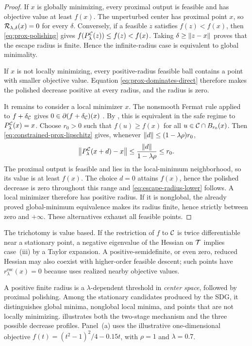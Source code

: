 \begin{proof}
  If \(x\) is globally minimizing, every proximal output is feasible and has
  objective value at least \(f(x)\).  The unperturbed center has proximal
  point \(x\), so \(\mathcal{R}_{\lambda,\delta}(x)=0\) for every \(\delta\).
  Conversely, if a feasible \(z\) satisfies \(f(z)<f(x)\), then
  \cref{eq:prox-polishing} gives
  \(f(P_\lambda^{\mathcal{C}}(z))\le f(z)<f(x)\).  Taking
  \(\delta\ge\left\lVert z-x\right\rVert\) proves that the escape radius is finite.  Hence the
  infinite-radius case is equivalent to global minimality.

  If \(x\) is not locally minimizing, every positive-radius feasible ball
  contains a point with smaller objective value.  Equation
  \eqref{eq:prox-dominates-direct} therefore makes the polished decrease
  positive at every radius, and the radius is zero.

  It remains to consider a local minimizer \(x\).  The nonsmooth Fermat rule
  applied to \(f+\delta_{\mathcal{C}}\) gives
  \(0\in\partial(f+\delta_{\mathcal{C}})(x)\)
  \cite[Theorem~10.1]{RockafellarWets1998}.  By
  , this is equivalent in the safe regime to
  \(P_\lambda^{\mathcal{C}}(x)=x\).  Choose \(r_0>0\) such that
  \(f(u)\ge f(x)\) for all \(u\in\mathcal{C}\cap B_{r_0}(x)\).  Then
  \cref{eq:constrained-prox-lipschitz} gives, whenever
  \(\left\lVert d\right\rVert\le(1-\lambda\rho)r_0\),
  \[
    \left\lVert P_\lambda^{\mathcal{C}}(x+d)-x\right\rVert
    \le\frac{\left\lVert d\right\rVert}{1-\lambda\rho}
    \le r_0.
  \]
  The proximal output is feasible and lies in the local-minimum
  neighborhood, so its value is at least \(f(x)\).  The choice \(d=0\)
  attains \(f(x)\), hence the polished decrease is zero throughout this
  range and \cref{eq:escape-radius-lower} follows.  A local minimizer therefore
  has positive radius.  If it is nonglobal, the already proved
  global-minimum equivalence makes its radius finite, hence strictly between
  zero and \(+\infty\).  These alternatives exhaust all feasible points.
\end{proof}

The trichotomy is value based.  If the restriction of \(f\) to \(\mathcal{C}\) is
twice differentiable near a stationary point, a negative eigenvalue of the
Hessian on \(\mathcal{T}\) implies case~(iii) by a Taylor expansion.  A
positive-semidefinite, or even zero, reduced Hessian may also coexist with
higher-order feasible descent; such points have
\(r_{\lambda}^{\mathrm{esc}}(x)=0\) because
 uses realized nearby objective values.

A positive finite radius is a \(\lambda\)-dependent threshold in
\emph{center space}, followed by proximal polishing.  Among the stationary
candidates produced by the SDG, it distinguishes global minima, nonglobal
local minima, and points that are not locally minimizing.
 illustrates both the two-stage mechanism
and the three possible decrease profiles.  Panel~(a) uses the illustrative
one-dimensional objective \(f(t)=(t^2-1)^2/4-0.15t\), with
\(\rho=1\) and \(\lambda=0.7\).


